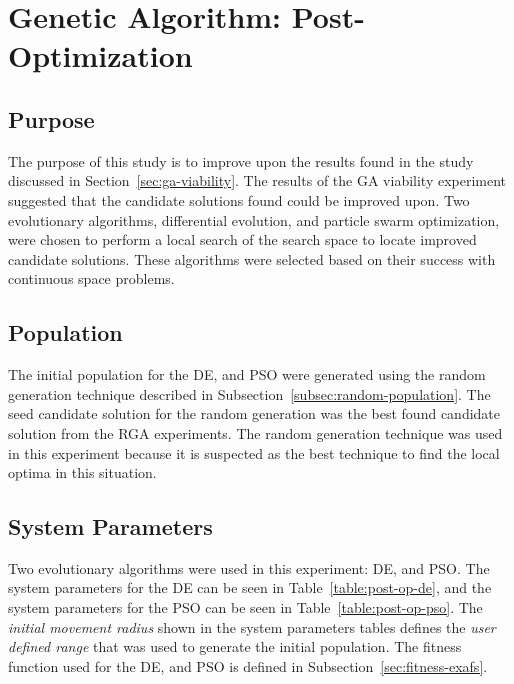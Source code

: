 \section{Genetic Algorithm: Post-Optimization}
\label{sec:ga-post-op}

\subsection{Purpose}

The purpose of this study is to improve upon the results found in the study discussed in Section~\ref{sec:ga-viability}. The results of the GA viability experiment suggested that the candidate solutions found could be improved upon. Two evolutionary algorithms, differential evolution, and particle swarm optimization, were chosen to perform a local search of the search space to locate improved candidate solutions. These algorithms were selected based on their success with continuous space problems.

\subsection{Population}

The initial population for the DE, and PSO were generated using the random generation technique described in Subsection~\ref{subsec:random-population}. The seed candidate solution for the random generation was the best found candidate solution from the RGA experiments. The random generation technique was used in this experiment because it is suspected as the best technique to find the local optima in this situation.


\subsection{System Parameters}

Two evolutionary algorithms were used in this experiment: DE, and PSO. The system parameters for the DE can be seen in Table~\ref{table:post-op-de}, and the system parameters for the PSO can be seen in Table~\ref{table:post-op-pso}. The \textit{initial movement radius} shown in the system parameters tables defines the \textit{user defined range} that was used to generate the initial population. The fitness function used for the DE, and PSO is defined in Subsection~\ref{sec:fitness-exafs}.

